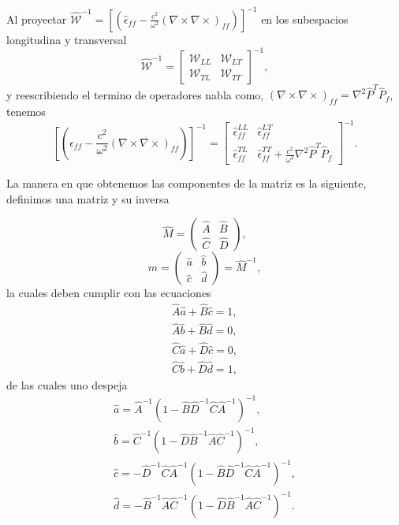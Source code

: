 \documentclass[12pt]{article}
\begin{document}
Al proyectar $\hat{\mathcal{W}}^{-1}=
\left[(\hat{\epsilon}_{ff}-\frac{c^{2}}{\omega^{2}}(\nabla \times
  \nabla \times)_{ff})\right]^{-1}$ en los subespacios longitudina y
transversal
\[\hat{\mathcal{W}}^{-1}=\left[
    \begin{array}{cc}
    \mathcal{W}_{LL} &  \mathcal{W}_{LT} \\
    \mathcal{W}_{TL} &  \mathcal{W}_{TT}
    \end{array}
    \right]^{-1}, \]
y reescribiendo el termino de operadores nabla como, $(\nabla \times \nabla \times)_{ff} = \nabla ^{2}\hat{P}^{T}\hat{P}_{f}$,
tenemos
\begin{equation}
  \label{MatrizdeProyeccionesdeW}
  \left[(\hat{\epsilon}_{ff}-\frac{c^{2}}{\omega^{2}}(\nabla \times \nabla \times)_{ff})\right]^{-1} = \left[
  \begin{array}{cc}
    \hat{\epsilon}_{ff}^{LL} & \hat{\epsilon}_{ff}^{LT} \\
    \hat{\epsilon}_{ff}^{TL} &  \hat{\epsilon}_{ff}^{TT}+ \frac{c^{2}}{\omega^{2}}\nabla ^{2}\hat{P}^{T}\hat{P}_{f}
  \end{array}
  \right]^{-1}.
\end{equation}

La manera en que obtenemos las componentes de la matriz es la
siguiente, definimos una matriz y su inversa

\[ \hat{M} = \left(
\begin{array}{cc}
  \hat{A} &  \hat{B} \\
   \hat{C} &  \hat{D}
\end{array}\right),
\] 
\[ \hat{m} =\left( 
\begin{array}{cc}
   \hat{a} &  \hat{b} \\
   \hat{c} &  \hat{d}
\end{array}\right) = \hat{M}^{-1},
\] 
la cuales deben cumplir con las ecuaciones
\begin{equation}
  \begin{split}
    \hat{A} \hat{a}+ \hat{B} \hat{c} = 1, \\
    \hat{A} \hat{b}+ \hat{B} \hat{d} = 0, \\
    \hat{C} \hat{a}+ \hat{D} \hat{c} = 0, \\
    \hat{C} \hat{b}+ \hat{D} \hat{d} = 1,
  \end{split}
\end{equation}
de las cuales uno despeja
\begin{equation}
  \label{eqsalgebraicas}
  \begin{split}
    \hat{a} = \hat{A}^{-1}(1-\hat{B}\hat{D}^{-1}\hat{C}\hat{A}^{-1})^{-1}, \\
    \hat{b} = \hat{C}^{-1}(1-\hat{D}\hat{B}^{-1}\hat{A}\hat{C}^{-1})^{-1}, \\
    \hat{c} = - \hat{D}^{-1}\hat{C}\hat{A}^{-1}(1-\hat{B}\hat{D}^{-1}\hat{C}\hat{A}^{-1})^{-1}, \\
    \hat{d} = - \hat{B}^{-1}\hat{A} \hat{C}^{-1}(1-\hat{D}\hat{B}^{-1}\hat{A}\hat{C}^{-1})^{-1}.
  \end{split}
\end{equation}
\end{document}
